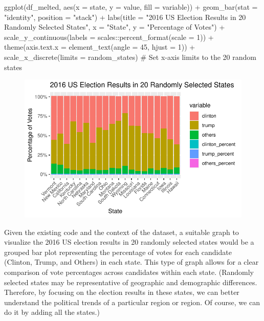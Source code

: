 \documentclass[
  letterpaper,
  DIV=11,
  numbers=noendperiod]{scrreprt}
\newenvironment{Shaded}{\begin{snugshade}}{\end{snugshade}}
\newcommand{\AttributeTok}[1]{\textcolor[rgb]{0.40,0.45,0.13}{#1}}
\newcommand{\CommentTok}[1]{\textcolor[rgb]{0.37,0.37,0.37}{#1}}
\newcommand{\DecValTok}[1]{\textcolor[rgb]{0.68,0.00,0.00}{#1}}
\newcommand{\FunctionTok}[1]{\textcolor[rgb]{0.28,0.35,0.67}{#1}}
\newcommand{\NormalTok}[1]{\textcolor[rgb]{0.00,0.23,0.31}{#1}}
\newcommand{\SpecialCharTok}[1]{\textcolor[rgb]{0.37,0.37,0.37}{#1}}
\newcommand{\StringTok}[1]{\textcolor[rgb]{0.13,0.47,0.30}{#1}}
\begin{document}
\begin{Shaded}
\begin{Highlighting}[]
\FunctionTok{ggplot}\NormalTok{(df\_melted, }\FunctionTok{aes}\NormalTok{(}\AttributeTok{x =}\NormalTok{ state, }\AttributeTok{y =}\NormalTok{ value, }\AttributeTok{fill =}\NormalTok{ variable)) }\SpecialCharTok{+}
  \FunctionTok{geom\_bar}\NormalTok{(}\AttributeTok{stat =} \StringTok{"identity"}\NormalTok{, }\AttributeTok{position =} \StringTok{"stack"}\NormalTok{) }\SpecialCharTok{+}
  \FunctionTok{labs}\NormalTok{(}\AttributeTok{title =} \StringTok{"2016 US Election Results in 20 Randomly Selected States"}\NormalTok{,}
       \AttributeTok{x =} \StringTok{"State"}\NormalTok{,}
       \AttributeTok{y =} \StringTok{"Percentage of Votes"}\NormalTok{) }\SpecialCharTok{+}
  \FunctionTok{scale\_y\_continuous}\NormalTok{(}\AttributeTok{labels =}\NormalTok{ scales}\SpecialCharTok{::}\FunctionTok{percent\_format}\NormalTok{(}\AttributeTok{scale =} \DecValTok{1}\NormalTok{)) }\SpecialCharTok{+}
  \FunctionTok{theme}\NormalTok{(}\AttributeTok{axis.text.x =} \FunctionTok{element\_text}\NormalTok{(}\AttributeTok{angle =} \DecValTok{45}\NormalTok{, }\AttributeTok{hjust =} \DecValTok{1}\NormalTok{)) }\SpecialCharTok{+}
  \FunctionTok{scale\_x\_discrete}\NormalTok{(}\AttributeTok{limits =}\NormalTok{ random\_states)  }\CommentTok{\# Set x{-}axis limits to the 20 random states}
\end{Highlighting}
\end{Shaded}

\begin{figure}[H]

{\centering \includegraphics{Final_files/figure-pdf/unnamed-chunk-1-1.pdf}

}

\end{figure}

Given the existing code and the context of the dataset, a suitable graph
to visualize the 2016 US election results in 20 randomly selected states
would be a grouped bar plot representing the percentage of votes for
each candidate (Clinton, Trump, and Others) in each state. This type of
graph allows for a clear comparison of vote percentages across
candidates within each state. (Randomly selected states may be
representative of geographic and demographic differences. Therefore, by
focusing on the election results in these states, we can better
understand the political trends of a particular region or region. Of
course, we can do it by adding all the states.)
\end{document}
